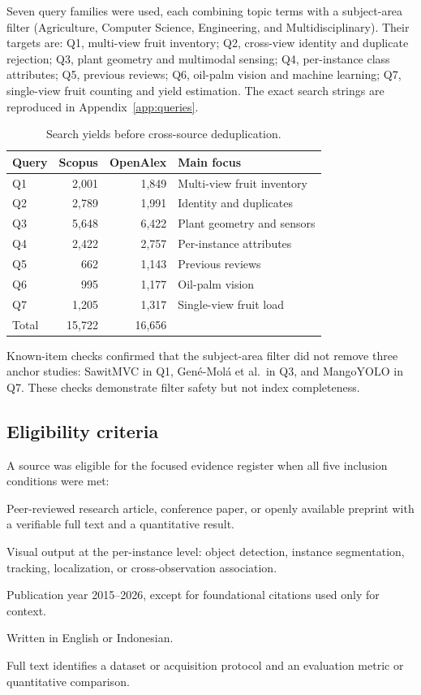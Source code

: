 Seven query families were used, each combining topic terms with a subject-area filter (Agriculture, Computer Science, Engineering, and Multidisciplinary). Their targets are: Q1, multi-view fruit inventory; Q2, cross-view identity and duplicate rejection; Q3, plant geometry and multimodal sensing; Q4, per-instance class attributes; Q5, previous reviews; Q6, oil-palm vision and machine learning; Q7, single-view fruit counting and yield estimation. The exact search strings are reproduced in Appendix~\ref{app:queries}.

\begin{table}[t]
\centering
\caption{Search yields before cross-source deduplication.}
\label{tab:searchcounts}
\small
\begin{tabular}{lrrl}
\toprule
Query & Scopus & OpenAlex & Main focus\\
\midrule
Q1 & 2{,}001 & 1{,}849 & Multi-view fruit inventory\\
Q2 & 2{,}789 & 1{,}991 & Identity and duplicates\\
Q3 & 5{,}648 & 6{,}422 & Plant geometry and sensors\\
Q4 & 2{,}422 & 2{,}757 & Per-instance attributes\\
Q5 & 662 & 1{,}143 & Previous reviews\\
Q6 & 995 & 1{,}177 & Oil-palm vision\\
Q7 & 1{,}205 & 1{,}317 & Single-view fruit load\\
\midrule
Total & 15{,}722 & 16{,}656 & \\
\bottomrule
\end{tabular}
\end{table}

Known-item checks confirmed that the subject-area filter did not remove three anchor studies: SawitMVC in Q1, Gené-Molá et al.\ in Q3, and MangoYOLO in Q7. These checks demonstrate filter safety but not index completeness.

\subsection{Eligibility criteria}

A source was eligible for the focused evidence register when all five inclusion conditions were met:

\begin{description}[leftmargin=*,style=nextline,itemsep=2pt]
  \item[IC1.] Peer-reviewed research article, conference paper, or openly available preprint with a verifiable full text and a quantitative result.
  \item[IC2.] Visual output at the per-instance level: object detection, instance segmentation, tracking, localization, or cross-observation association.
  \item[IC3.] Publication year 2015--2026, except for foundational citations used only for context.
  \item[IC4.] Written in English or Indonesian.
  \item[IC5.] Full text identifies a dataset or acquisition protocol and an evaluation metric or quantitative comparison.
\end{description}

